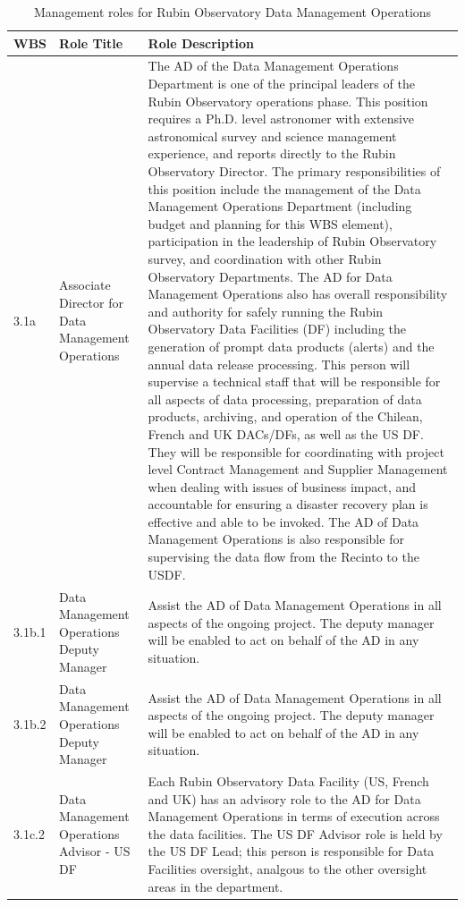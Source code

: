 \normalsize \begin{longtable} {|p{}|p{}|p{}|} \caption{Management roles for Rubin Observatory Data Management Operations \label{tab:mroles}}\\ 
\hline 
\textbf{WBS}&\textbf{Role Title}&\textbf{Role Description} \\ \hline
{3.1a}&{Associate Director for Data Management Operations}&{The AD of the Data Management Operations Department is one of the principal leaders of the Rubin Observatory operations phase. This position requires a Ph.D. level astronomer with extensive astronomical survey and science management experience, and reports directly to the Rubin Observatory Director. The primary responsibilities of this position include the management of the Data Management Operations Department (including budget and planning for this WBS element), participation in the leadership of Rubin Observatory survey, and coordination with other Rubin Observatory Departments. The AD for Data Management Operations also has overall responsibility and authority for safely running the Rubin Observatory Data Facilities (DF) including the generation of prompt data products (alerts) and the annual data release processing. This person will supervise a technical staff that will be responsible for all aspects of data processing, preparation of data products, archiving, and operation of the Chilean, French and UK DACs/DFs, as well as the US DF. They will be responsible for coordinating with project level Contract Management and Supplier Management when dealing with issues of business impact, and accountable for ensuring a disaster recovery plan is effective and able to be invoked. The AD of Data Management Operations is also responsible for supervising the data flow from the Recinto to the USDF.} \\ \hline
{3.1b.1}&{Data Management Operations Deputy Manager}&{Assist the AD of Data Management Operations in all aspects of the ongoing project. The deputy manager will be enabled to act on behalf of the AD in any situation.} \\ \hline
{3.1b.2}&{Data Management Operations Deputy Manager}&{Assist the AD of Data Management Operations in all aspects of the ongoing project. The deputy manager will be enabled to act on behalf of the AD in any situation.} \\ \hline
{3.1c.2}&{Data Management Operations Advisor - US DF}&{Each Rubin Observatory Data Facility (US, French and UK) has an advisory role to the AD for Data Management Operations in terms of execution across the data facilities.  The US DF Advisor role is held by the US DF Lead; this person is responsible for Data Facilities oversight, analgous to the other oversight areas in the department. } \\ \hline

\end{longtable}
